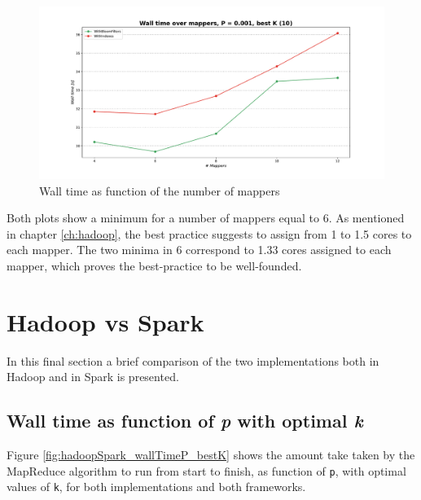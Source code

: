 \begin{figure}[H]
    \begin{center}
        \includegraphics[scale=.45,trim={3cm 0 3cm 0},clip]{img/hadoop_wallTimeMap.pdf}
    \end{center}
    \vspace*{-0.5cm}
    \caption{Wall time as function of the number of mappers}
    \label{fig:hadoop_wallTimeMap}
\end{figure}

\noindent Both plots show a minimum for a number of mappers equal to 6. As mentioned in chapter \ref{ch:hadoop}, the best practice suggests to assign from 1 to 1.5 cores to each mapper. The two minima in 6 correspond to 1.33 cores assigned to each mapper, which proves the best-practice to be well-founded.

\section{Hadoop vs Spark}

In this final section a brief comparison of the two implementations both in Hadoop and in Spark is presented.

\subsection*{Wall time as function of \textit{p} with optimal \textit{k}}

Figure \ref{fig:hadoopSpark_wallTimeP_bestK} shows the amount take taken by the MapReduce algorithm to run from start to finish, as function of \texttt{p}, with optimal values of \texttt{k}, for both implementations and both frameworks.\\

